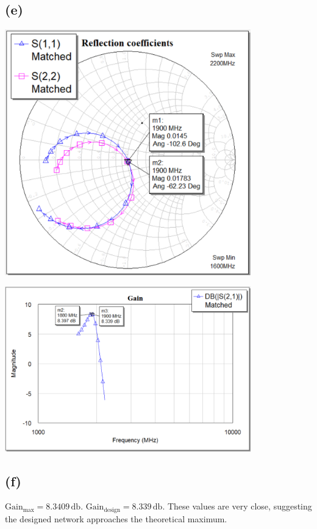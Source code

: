 \documentclass[12pt]{article}
\begin{document}
\subsection*{(e)}

\begin{center}
    \includegraphics[width=0.8\textwidth]{5 reflection coefficients.png}
    
    \includegraphics[width=0.8\textwidth]{5 gain.png}
\end{center}

\subsection*{(f)}

$\text{Gain}_{\text{max}} = 8.3409\,\unit{\decibel}$. $\text{Gain}_{\text{design}} = 8.339\,\unit{\decibel}$.
These values are very close, suggesting the designed network approaches the theoretical maximum. 
\end{document}
